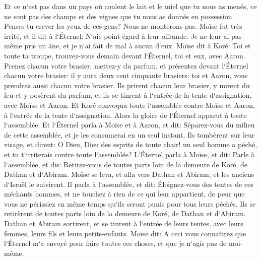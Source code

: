 \verse Et ce n`est pas dans un pays où coulent le lait et le miel que tu nous as menés, ce ne sont pas des champs et des vignes que tu nous as donnés en possession. Penses-tu crever les yeux de ces gens? Nous ne monterons pas. 
\verse Moïse fut très irrité, et il dit à l`Éternel: N`aie point égard à leur offrande. Je ne leur ai pas même pris un âne, et je n`ai fait de mal à aucun d`eux. 
\verse Moïse dit à Koré: Toi et toute ta troupe, trouvez-vous demain devant l`Éternel, toi et eux, avec Aaron. 
\verse Prenez chacun votre brasier, mettez-y du parfum, et présentez devant l`Éternel chacun votre brasier: il y aura deux cent cinquante brasiers; toi et Aaron, vous prendrez aussi chacun votre brasier. 
\verse Ils prirent chacun leur brasier, y mirent du feu et y posèrent du parfum, et ils se tinrent à l`entrée de la tente d`assignation, avec Moïse et Aaron. 
\verse Et Koré convoqua toute l`assemblée contre Moïse et Aaron, à l`entrée de la tente d`assignation. Alors la gloire de l`Éternel apparut à toute l`assemblée. 
\verse Et l`Éternel parla à Moïse et à Aaron, et dit: 
\verse Séparez-vous du milieu de cette assemblée, et je les consumerai en un seul instant. 
\verse Ils tombèrent sur leur visage, et dirent: O Dieu, Dieu des esprits de toute chair! un seul homme a péché, et tu t`irriterais contre toute l`assemblée? 
\verse L`Éternel parla à Moïse, et dit: 
\verse Parle à l`assemblée, et dis: Retirez-vous de toutes parts loin de la demeure de Koré, de Dathan et d`Abiram. 
\verse Moïse se leva, et alla vers Dathan et Abiram; et les anciens d`Israël le suivirent. 
\verse Il parla à l`assemblée, et dit: Éloignez-vous des tentes de ces méchants hommes, et ne touchez à rien de ce qui leur appartient, de peur que vous ne périssiez en même temps qu`ils seront punis pour tous leurs péchés. 
\verse Ils se retirèrent de toutes parts loin de la demeure de Koré, de Dathan et d`Abiram. Dathan et Abiram sortirent, et se tinrent à l`entrée de leurs tentes, avec leurs femmes, leurs fils et leurs petits-enfants. 
\verse Moïse dit: A ceci vous connaîtrez que l`Éternel m`a envoyé pour faire toutes ces choses, et que je n`agis pas de moi-même. 
